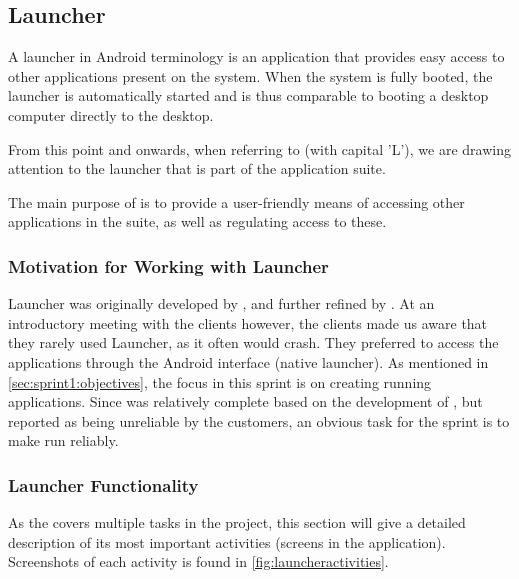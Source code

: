 \subsection{Launcher}\label{sec:launcher}
A launcher in Android terminology is an application that provides easy access to other applications present on the system.
When the system is fully booted, the launcher is automatically started and is thus comparable to booting a desktop computer directly to the desktop.

From this point and onwards, when referring to \textit{\launcher} (with capital 'L'), we are drawing attention to the launcher that is part of the \giraf application suite.

The main purpose of \launcher is to provide a user-friendly means of accessing other applications in the \giraf suite, as well as regulating access to these.

\subsubsection{Motivation for Working with Launcher}
Launcher was originally developed by \citet{launcher2011}, and further refined by \citet{launcher2012}.
At an introductory meeting with the clients however, the clients made us aware that they rarely used Launcher, as it often would crash.
They preferred to access the \giraf applications through the Android interface (native launcher).
As mentioned in \cref{sec:sprint1:objectives}, the focus in this sprint is on creating running applications.
Since \launcher was relatively complete based on the development of \citet{launcher2012}, but reported as being unreliable by the customers, an obvious task for the sprint is to make \launcher run reliably.

\subsubsection{Launcher Functionality}
As the \launcher covers multiple tasks in the \giraf project, this section will give a detailed description of its most important activities (screens in the application).
Screenshots of each activity is found in \cref{fig:launcheractivities}.

